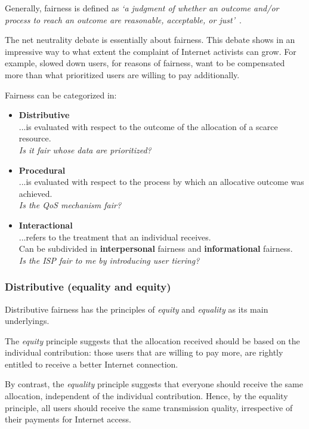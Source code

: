 
Generally, fairness is defined as \emph{`a judgment of whether an outcome and/or process to reach an outcome are reasonable, acceptable, or just'}~\cite{kramer2013fair}.

The net neutrality debate is essentially about fairness. This debate shows in an impressive way to what extent the complaint of Internet activists can grow. For example, slowed down users, for reasons of fairness, want to be compensated more than what prioritized users are willing to pay additionally.

Fairness can be categorized in:
\begin{itemize}
	\item \textbf{Distributive}\\
		...is evaluated with respect to the outcome of the allocation of a scarce resource.\\
		\emph{Is it fair whose data are prioritized?}

	\item \textbf{Procedural}\\
		...is evaluated with respect to the process by which an allocative outcome was achieved.\\
		\emph{Is the QoS mechanism fair?}

	\item \textbf{Interactional}\\
		...refers to the treatment that an individual receives.\\
		Can be subdivided in \textbf{interpersonal} fairness and \textbf{informational} fairness.\\
		\emph{Is the ISP fair to me by introducing user tiering?}
\end{itemize}

\subsubsection{Distributive (equality and equity)}
Distributive fairness has the principles of \emph{equity} and \emph{equality} as its main underlyings.

The \emph{equity} principle suggests that the allocation received should be based on the individual contribution: those users that are willing to pay more, are rightly entitled to receive a better Internet connection.

By contrast, the \emph{equality} principle suggests that everyone should receive the same allocation, independent of the individual contribution. Hence, by the equality principle, all users should receive the same transmission quality, irrespective of their payments for Internet access.

